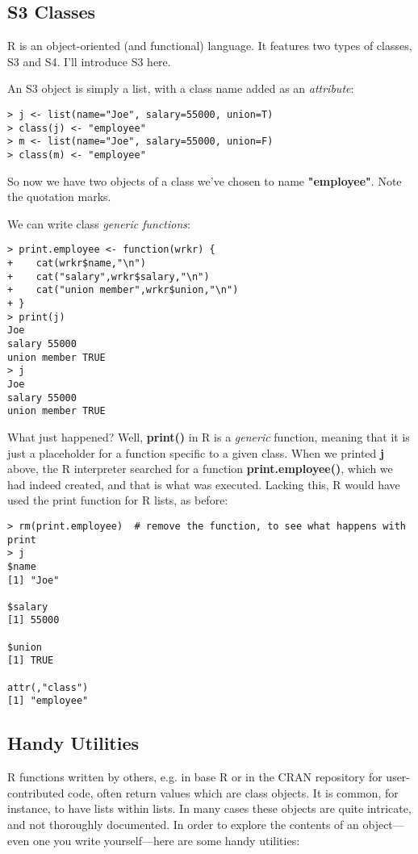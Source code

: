 \subsection{S3 Classes}

R is an object-oriented (and functional) language.  It features two
types of classes, S3 and S4.  I'll introduce S3 here.

An S3 object is simply a list, with a class name added as an {\it
attribute}:

\begin{lstlisting}
> j <- list(name="Joe", salary=55000, union=T)
> class(j) <- "employee"
> m <- list(name="Joe", salary=55000, union=F)
> class(m) <- "employee"
\end{lstlisting}

So now we have two objects of a class we've chosen to name {\bf
"employee"}.  Note the quotation marks.

We can write class {\it generic functions}:

\begin{lstlisting}
> print.employee <- function(wrkr) {
+    cat(wrkr$name,"\n")
+    cat("salary",wrkr$salary,"\n")
+    cat("union member",wrkr$union,"\n")
+ }
> print(j)
Joe 
salary 55000 
union member TRUE 
> j
Joe 
salary 55000 
union member TRUE 
\end{lstlisting}

What just happened?  Well, {\bf print()} in R is a {\it generic}
function, meaning that it is just a placeholder for a function specific
to a given class.  When we printed {\bf j} above, the R interpreter
searched for a function {\bf print.employee()}, which we had indeed
created, and that is what was executed.  Lacking this, R would have used
the print function for R lists, as before:

\begin{lstlisting}
> rm(print.employee)  # remove the function, to see what happens with print
> j
$name
[1] "Joe"

$salary
[1] 55000

$union
[1] TRUE

attr(,"class")
[1] "employee"
\end{lstlisting}

\subsection{Handy Utilities}

R functions written by others, e.g. in base R or in the CRAN repository
for user-contributed code, often return values which are class objects.
It is common, for instance, to have lists within lists.  In many cases
these objects are quite intricate, and not thoroughly documented.  In
order to explore the contents of an object---even one you write
yourself---here are some handy utilities:

